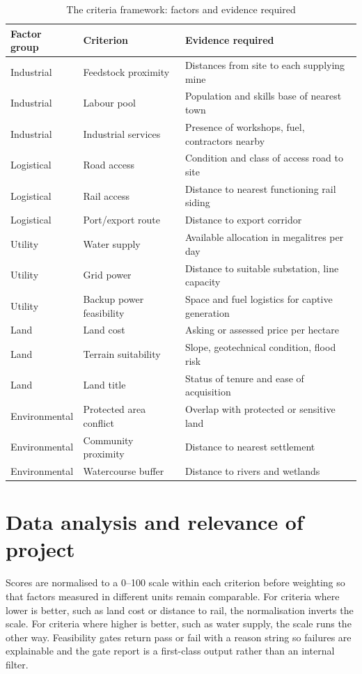 \documentclass[12pt,a4paper]{report}
\begin{document}
\begin{table}[h]
\centering
\caption{The criteria framework: factors and evidence required}
\begin{tabular}{p{3.0cm}p{4.4cm}p{6.0cm}}
\toprule
Factor group & Criterion & Evidence required \\
\midrule
Industrial & Feedstock proximity & Distances from site to each
supplying mine \\
Industrial & Labour pool & Population and skills base of nearest town \\
Industrial & Industrial services & Presence of workshops, fuel,
contractors nearby \\
Logistical & Road access & Condition and class of access road to site \\
Logistical & Rail access & Distance to nearest functioning rail siding \\
Logistical & Port/export route & Distance to export corridor \\
Utility & Water supply & Available allocation in megalitres per day \\
Utility & Grid power & Distance to suitable substation, line capacity \\
Utility & Backup power feasibility & Space and fuel logistics for
captive generation \\
Land & Land cost & Asking or assessed price per hectare \\
Land & Terrain suitability & Slope, geotechnical condition, flood risk \\
Land & Land title & Status of tenure and ease of acquisition \\
Environmental & Protected area conflict & Overlap with protected or
sensitive land \\
Environmental & Community proximity & Distance to nearest settlement \\
Environmental & Watercourse buffer & Distance to rivers and wetlands \\
\bottomrule
\end{tabular}
\end{table}

\section{Data analysis and relevance of project}
Scores are normalised to a 0--100 scale within each criterion before
weighting so that factors measured in different units remain
comparable. For criteria where lower is better, such as land cost or
distance to rail, the normalisation inverts the scale. For criteria
where higher is better, such as water supply, the scale runs the other
way. Feasibility gates return pass or fail with a reason string so
failures are explainable and the gate report is a first-class output
rather than an internal filter.
\end{document}
